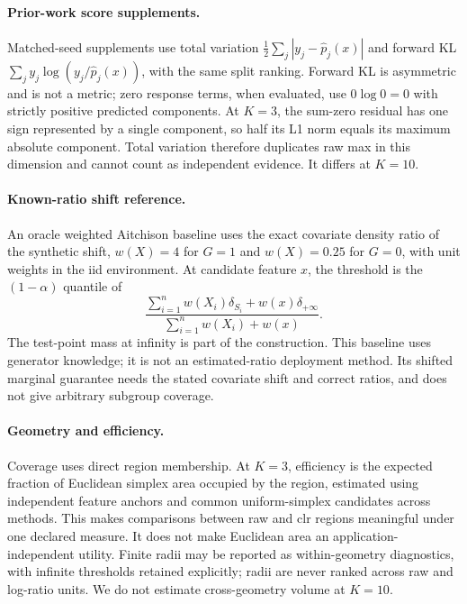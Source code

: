 \paragraph{Prior-work score supplements.}
Matched-seed supplements use total variation $\frac12\sum_j|y_j-\hat p_j(x)|$ and forward KL $\sum_j y_j\log(y_j/\hat p_j(x))$, with the same split ranking. Forward KL is asymmetric and is not a metric; zero response terms, when evaluated, use $0\log0=0$ with strictly positive predicted components. At $K=3$, the sum-zero residual has one sign represented by a single component, so half its L1 norm equals its maximum absolute component. Total variation therefore duplicates raw max in this dimension and cannot count as independent evidence. It differs at $K=10$.

\paragraph{Known-ratio shift reference.}
An oracle weighted Aitchison baseline uses the exact covariate density ratio of the synthetic shift, $w(X)=4$ for $G=1$ and $w(X)=0.25$ for $G=0$, with unit weights in the iid environment. At candidate feature $x$, the threshold is the $(1-\alpha)$ quantile of
\begin{equation}
 \frac{\sum_{i=1}^n w(X_i)\delta_{S_i}+w(x)\delta_{+\infty}}
 {\sum_{i=1}^n w(X_i)+w(x)}.
\end{equation}
The test-point mass at infinity is part of the construction. This baseline uses generator knowledge; it is not an estimated-ratio deployment method. Its shifted marginal guarantee needs the stated covariate shift and correct ratios, and does not give arbitrary subgroup coverage.

\paragraph{Geometry and efficiency.}
Coverage uses direct region membership. At $K=3$, efficiency is the expected fraction of Euclidean simplex area occupied by the region, estimated using independent feature anchors and common uniform-simplex candidates across methods. This makes comparisons between raw and clr regions meaningful under one declared measure. It does not make Euclidean area an application-independent utility. Finite radii may be reported as within-geometry diagnostics, with infinite thresholds retained explicitly; radii are never ranked across raw and log-ratio units. We do not estimate cross-geometry volume at $K=10$.

